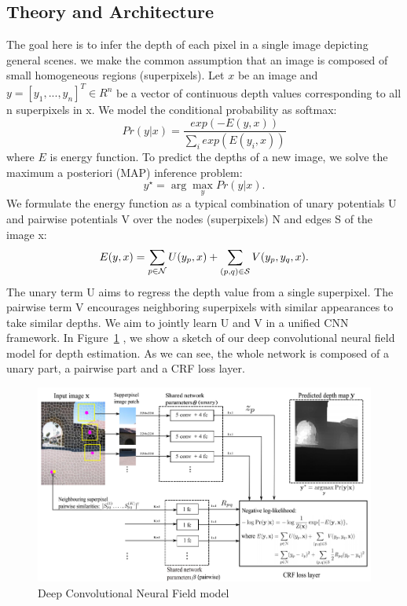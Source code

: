 \documentclass[journal]{IEEEtran}
\begin{document}
\subsection{Theory and Architecture}
The goal here is to infer the depth of each pixel in a single image depicting 
general scenes. we make the common assumption that an image is composed of small 
homogeneous regions (superpixels). 
Let $x$ be an image and $y=[y_1,...,y_n]^T\in R^n$ be a vector of continuous 
depth values corresponding to all n superpixels in x. We model the conditional 
probability as softmax:
\begin{equation}
Pr(y|x)=\frac{exp(-E(y,x))}{\sum_i 
	exp(E(y_i,x))}
\end{equation}
where $E$ is energy function.
To predict the depths of a new image, we solve the maximum a posteriori (MAP) 
inference problem: 
\begin{equation}
\label{eq:inference}
y^{\star}=\arg\max\limits_y Pr(y|x). 
\end{equation}
We formulate the energy function as a 
typical combination of unary potentials U and pairwise potentials V over the 
nodes (superpixels) N and edges S of the image x:
\begin{equation}\label{eq:energy}
E(y, x) = \sum_{p \in {\cal N} } U(y_{p}, x) 
+ \sum_{(p,q) \in {\cal S}} V(y_{p}, y_{q}, x).
\end{equation}
The unary term U aims to regress the depth value from a single superpixel. The 
pairwise term V encourages neighboring superpixels with similar appearances 
to take similar depths. We aim to jointly learn U and V in a unified CNN 
framework.
In Figure~\ref{fig:arch} , we show a sketch of our deep convolutional
neural field model for depth estimation. As we can see, the whole network is 
composed of a unary part, a pairwise part and a CRF loss layer.
\begin{figure}
	\includegraphics[width=.9\linewidth]{arch.png}
	\caption{Deep Convolutional Neural Field model}
	\label{fig:arch}
\end{figure}
\end{document}
